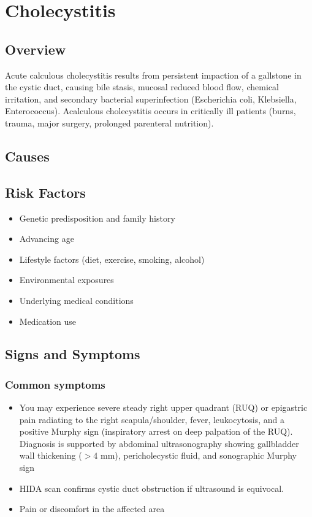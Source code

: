 \chapter{Cholecystitis}
\label{sec:Cholecystitis}

\section{Overview}
Acute calculous cholecystitis results from persistent impaction of a gallstone in the cystic duct, causing bile stasis, mucosal reduced blood flow, chemical irritation, and secondary bacterial superinfection (Escherichia coli, Klebsiella, Enterococcus). Acalculous cholecystitis occurs in critically ill patients (burns, trauma, major surgery, prolonged parenteral nutrition).
\section{Causes}
\section{Risk Factors}

\begin{itemize}[noitemsep]
  \item Genetic predisposition and family history
  \item Advancing age
  \item Lifestyle factors (diet, exercise, smoking, alcohol)
  \item Environmental exposures
  \item Underlying medical conditions
  \item Medication use
\end{itemize}
\section{Signs and Symptoms}

\subsection{Common symptoms}
\begin{itemize}[noitemsep]
  \item You may experience severe steady right upper quadrant (RUQ) or epigastric pain radiating to the right scapula/shoulder, fever, leukocytosis, and a positive Murphy sign (inspiratory arrest on deep palpation of the RUQ). Diagnosis is supported by abdominal ultrasonography showing gallbladder wall thickening ($>4$ mm), pericholecystic fluid, and sonographic Murphy sign
  \item HIDA scan confirms cystic duct obstruction if ultrasound is equivocal.
  \item Pain or discomfort in the affected area
  \end{itemize}

